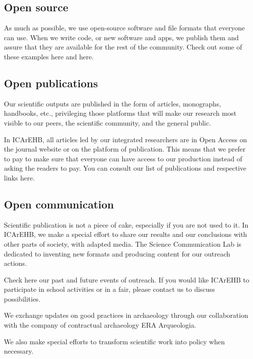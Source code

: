 \documentclass[
  letterpaper,
  DIV=11,
  numbers=noendperiod]{scrreprt}
\begin{document}
\hypertarget{open-source}{%
\subsection{Open source}\label{open-source}}

As much as possible, we use open-source software and file formats that
everyone can use. When we write code, or new software and apps, we
publish them and assure that they are available for the rest of the
community. Check out some of these examples here and here.

\hypertarget{open-publications}{%
\subsection{Open publications}\label{open-publications}}

Our scientific outputs are published in the form of articles,
monographs, handbooks, etc., privileging those platforms that will make
our research most visible to our peers, the scientific community, and
the general public.

In ICArEHB, all articles led by our integrated researchers are in Open
Access on the journal website or on the platform of publication. This
means that we prefer to pay to make sure that everyone can have access
to our production instead of asking the readers to pay. You can consult
our list of publications and respective links here.~

\hypertarget{open-communication}{%
\subsection{Open communication}\label{open-communication}}

Scientific publication is not a piece of cake, especially if you are not
used to it. In ICArEHB, we make a special effort to share our results
and our conclusions with other parts of society, with adapted media. The
Science Communication Lab is dedicated to inventing new formats and
producing content for our outreach actions.~

Check here our past and future events of outreach. If you would like
ICArEHB to participate in school activities or in a fair, please contact
us to discuss possibilities.

We exchange updates on good practices in archaeology through our
collaboration with the company of contractual archaeology ERA
Arqueologia.

We also make special efforts to transform scientific work into policy
when necessary.
\end{document}
